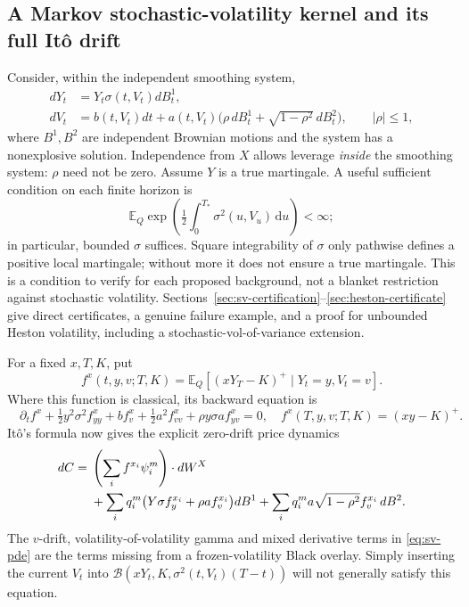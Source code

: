\documentclass[11pt,a4paper]{article}
\numberwithin{equation}{section}
\theoremstyle{definition}\newtheorem{definition}[theorem]{Definition}
\theoremstyle{remark}\newtheorem{remark}[theorem]{Remark}
\newcommand{\E}{\mathbb E}\newcommand{\R}{\mathbb R}
\newcommand{\dd}{\,\mathrm d}\newcommand{\dt}{\,\mathrm dt}
\newcommand{\Black}{\mathcal B}\newcommand{\LC}{\mathcal L}
\begin{document}
\subsection{A Markov stochastic-volatility kernel and its full It\^o drift}
Consider, within the independent smoothing system,
\begin{align}
 dY_t&=Y_t\sigma(t,V_t)dB_t^1,\label{eq:sv-y}\\
 dV_t&=b(t,V_t)dt+a(t,V_t)
       \bigl(\rho\,dB_t^1+\sqrt{1-\rho^2}\,dB_t^2\bigr),
 \qquad |\rho|\leq1,\label{eq:sv-v}
\end{align}
where $B^1,B^2$ are independent Brownian motions and the system has a nonexplosive solution. Independence from $X$ allows leverage \emph{inside} the smoothing system: $\rho$ need not be zero. Assume $Y$ is a true martingale. A useful sufficient condition on each finite horizon is
\begin{equation}
 \E_Q\exp\left(\tfrac12\int_0^{T_*}\sigma^2(u,V_u)\dd u\right)<\infty;
 \label{eq:sv-novikov}
\end{equation}
in particular, bounded $\sigma$ suffices. Square integrability of $\sigma$ only pathwise defines a positive local martingale; without more it does not ensure a true martingale. This is a condition to verify for each proposed background, not a blanket restriction against stochastic volatility. Sections~\ref{sec:sv-certification}--\ref{sec:heston-certificate} give direct certificates, a genuine failure example, and a proof for unbounded Heston volatility, including a stochastic-vol-of-variance extension.

For a fixed $x,T,K$, put
\[
 f^x(t,y,v;T,K)=\E_Q[(xY_T-K)^+\mid Y_t=y,V_t=v].
\]
Where this function is classical, its backward equation is
\begin{equation}
 \boxed{\quad
 \partial_tf^x+\tfrac12y^2\sigma^2 f^x_{yy}
 +b f^x_v+\tfrac12a^2 f^x_{vv}
 +\rho y\sigma a f^x_{yv}=0,
 \quad f^x(T,y,v;T,K)=(xy-K)^+.
 \quad}
 \label{eq:sv-pde}
\end{equation}
It\^o's formula now gives the explicit zero-drift price dynamics
\begin{align}
 dC={}&\left(\sum_if^{x_i}\psi_i^m\right)\cdot dW^X\notag\\
 &+\sum_iq_i^m\bigl(Y\sigma f^{x_i}_y+\rho a f^{x_i}_v\bigr)dB^1
 +\sum_iq_i^m a\sqrt{1-\rho^2}f^{x_i}_v\,dB^2.
 \label{eq:sv-call-vol}
\end{align}
The $v$-drift, volatility-of-volatility gamma and mixed derivative terms in \eqref{eq:sv-pde} are the terms missing from a frozen-volatility Black overlay. Simply inserting the current $V_t$ into $\Black(xY_t,K,\sigma^2(t,V_t)(T-t))$ will not generally satisfy this equation.
\end{document}
